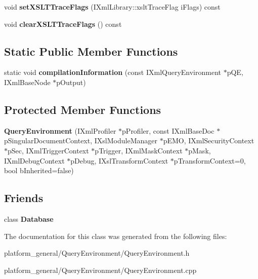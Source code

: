 \begin{DoxyCompactItemize}
\item 
\hypertarget{classgeneral__server_1_1QueryEnvironment_ab8b57954bb6c90b5706ae7a5b58f551c}{void {\bfseries set\-X\-S\-L\-T\-Trace\-Flags} (\-I\-Xml\-Library\-::xslt\-Trace\-Flag i\-Flags) const }\label{classgeneral__server_1_1QueryEnvironment_ab8b57954bb6c90b5706ae7a5b58f551c}

\item 
\hypertarget{classgeneral__server_1_1QueryEnvironment_a4e99f74b099bf4fc4aebb7d8507f71a8}{void {\bfseries clear\-X\-S\-L\-T\-Trace\-Flags} () const }\label{classgeneral__server_1_1QueryEnvironment_a4e99f74b099bf4fc4aebb7d8507f71a8}

\end{DoxyCompactItemize}
\subsection*{\-Static \-Public \-Member \-Functions}
\begin{DoxyCompactItemize}
\item 
\hypertarget{classgeneral__server_1_1QueryEnvironment_a217bb6561ee653a060b229f4e8b0ea29}{static void {\bfseries compilation\-Information} (const \-I\-Xml\-Query\-Environment $\ast$p\-Q\-E, \-I\-Xml\-Base\-Node $\ast$p\-Output)}\label{classgeneral__server_1_1QueryEnvironment_a217bb6561ee653a060b229f4e8b0ea29}

\end{DoxyCompactItemize}
\subsection*{\-Protected \-Member \-Functions}
\begin{DoxyCompactItemize}
\item 
\hypertarget{classgeneral__server_1_1QueryEnvironment_af1248f1bff45acd793d5e5d6f064156a}{{\bfseries \-Query\-Environment} (\-I\-Xml\-Profiler $\ast$p\-Profiler, const \-I\-Xml\-Base\-Doc $\ast$p\-Singular\-Document\-Context, \-I\-Xsl\-Module\-Manager $\ast$p\-E\-M\-O, \-I\-Xml\-Security\-Context $\ast$p\-Sec, \-I\-Xml\-Trigger\-Context $\ast$p\-Trigger, \-I\-Xml\-Mask\-Context $\ast$p\-Mask, \-I\-Xml\-Debug\-Context $\ast$p\-Debug, \-I\-Xsl\-Transform\-Context $\ast$p\-Transform\-Context=0, bool b\-Inherited=false)}\label{classgeneral__server_1_1QueryEnvironment_af1248f1bff45acd793d5e5d6f064156a}

\end{DoxyCompactItemize}
\subsection*{\-Friends}
\begin{DoxyCompactItemize}
\item 
\hypertarget{classgeneral__server_1_1QueryEnvironment_a6efef52d7a939622bbc934ff6b90ffe0}{class {\bfseries \-Database}}\label{classgeneral__server_1_1QueryEnvironment_a6efef52d7a939622bbc934ff6b90ffe0}

\end{DoxyCompactItemize}


\-The documentation for this class was generated from the following files\-:\begin{DoxyCompactItemize}
\item 
platform\-\_\-general/\-Query\-Environment/\-Query\-Environment.\-h\item 
platform\-\_\-general/\-Query\-Environment/\-Query\-Environment.\-cpp\end{DoxyCompactItemize}
